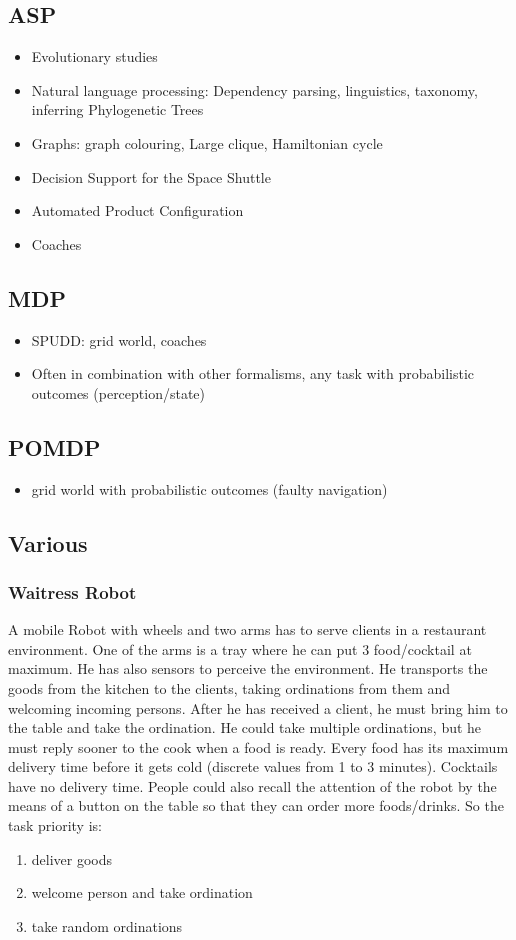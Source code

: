 \documentclass[pdftex,12pt,a4paper]{report}
\begin{document}
\subsection{ASP}
\begin{itemize}
\item Evolutionary studies
\item Natural language processing: Dependency parsing, linguistics, taxonomy, inferring Phylogenetic Trees
\item Graphs: graph colouring, Large clique, Hamiltonian cycle
\item Decision Support for the Space Shuttle
\item Automated Product Configuration
\item Coaches
\end{itemize}

\subsection{MDP}
\begin{itemize}
\item SPUDD: grid world, coaches
\item Often in combination with other formalisms, any task with probabilistic outcomes (perception/state)
\end{itemize}
\subsection{POMDP}
\begin{itemize}
\item grid world with probabilistic outcomes (faulty navigation)
\end{itemize}

\subsection{Various}
\subsubsection{Waitress Robot}
A mobile Robot with wheels and two arms has to serve clients in a restaurant environment. One of the arms is a tray where he can put 3 food/cocktail at maximum. He has also sensors to perceive the environment.
He transports the goods from the kitchen to the clients, taking ordinations from them and welcoming incoming persons. After he has received a client, he must bring him to the table and take the ordination. He could take multiple ordinations, but he must reply sooner to the cook when a food is ready. Every food has its maximum delivery time before it gets cold (discrete values from 1 to 3 minutes). Cocktails have no delivery time.
People could also recall the attention of the robot by the means of a button on the table so that they can order more foods/drinks. So the task priority is:
\begin{enumerate}
\item deliver goods
\item welcome person and take ordination
\item take random ordinations
\end{enumerate}
\end{document}
